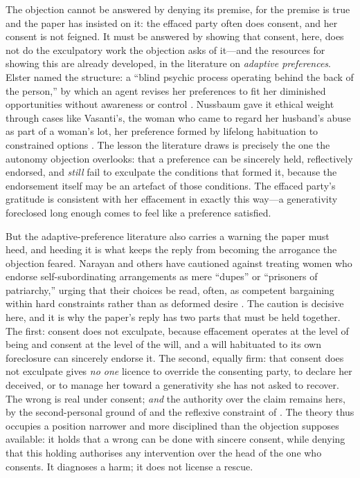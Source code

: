 The objection cannot be answered by denying its premise, for the premise is true and the paper has insisted on it: the effaced party often does consent, and her consent is not feigned. It must be answered by showing that consent, here, does not do the exculpatory work the objection asks of it---and the resources for showing this are already developed, in the literature on \emph{adaptive preferences}. Elster named the structure: a ``blind psychic process operating behind the back of the person,'' by which an agent revises her preferences to fit her diminished opportunities without awareness or control \parencite{elster1983}. Nussbaum gave it ethical weight through cases like Vasanti's, the woman who came to regard her husband's abuse as part of a woman's lot, her preference formed by lifelong habituation to constrained options \parencite{nussbaum2000women}. The lesson the literature draws is precisely the one the autonomy objection overlooks: that a preference can be sincerely held, reflectively endorsed, and \emph{still} fail to exculpate the conditions that formed it, because the endorsement itself may be an artefact of those conditions. The effaced party's gratitude is consistent with her effacement in exactly this way---a generativity foreclosed long enough comes to feel like a preference satisfied.

But the adaptive-preference literature also carries a warning the paper must heed, and heeding it is what keeps the reply from becoming the arrogance the objection feared. Narayan and others have cautioned against treating women who endorse self-subordinating arrangements as mere ``dupes'' or ``prisoners of patriarchy,'' urging that their choices be read, often, as competent bargaining within hard constraints rather than as deformed desire \parencite{narayan2002}. The caution is decisive here, and it is why the paper's reply has two parts that must be held together. The first: consent does not exculpate, because effacement operates at the level of being and consent at the level of the will, and a will habituated to its own foreclosure can sincerely endorse it. The second, equally firm: that consent does not exculpate gives \emph{no one} licence to override the consenting party, to declare her deceived, or to manage her toward a generativity she has not asked to recover. The wrong is real under consent; \emph{and} the authority over the claim remains hers, by the second-personal ground of  and the reflexive constraint of . The theory thus occupies a position narrower and more disciplined than the objection supposes available: it holds that a wrong can be done with sincere consent, while denying that this holding authorises any intervention over the head of the one who consents. It diagnoses a harm; it does not license a rescue.

